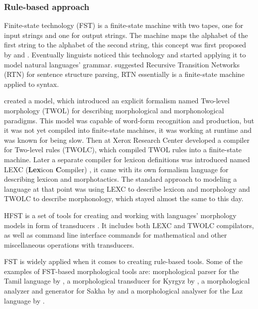 \subsubsection{Rule-based approach}
\par Finite-state technology (FST) is a finite-state machine with two tapes, one for input strings and one for output strings. The machine maps the alphabet of the first string to the alphabet of the second string, this concept was first proposed by \textcite{mealy_method_1955} and \textcite{moore_gedanken_1955}. Eventually linguists noticed this technology and started applying it to model natural languages' grammar. \textcite{woods_trans_1970} suggested Recursive Transition Networks (RTN) for sentence structure parsing, RTN essentially is a finite-state machine applied to syntax. 
\par \textcite{koskenniemi_twol_1983} created a model, which introduced an explicit formalism named Two-level morphology (TWOL) for describing morphological and morphonological paradigms. This model was capable of word-form recognition and production, but it was not yet compiled into finite-state machines, it was working at runtime and was known for being slow. Then \textcite{karttunen_twolc_1987} at Xerox Research Center developed a compiler for Two-level rules (TWOLC), which compiled TWOL rules into a finite-state machine. Later a separate compiler for lexicon definitions was introduced named LEXC (\textbf{Lex}icon \textbf{C}ompiler) \parencite{karttunen_lexc_1993}, it came with its own formalism language for describing lexicon and morphotactics. The standard approach to modeling a language at that point was using LEXC to describe lexicon and morphology and TWOLC to describe morphonology, which stayed almost the same to this day. 
\par {}
\par HFST is a set of tools for creating and working with languages' morphology models in form of transducers \parencite{linden_hfst_2009}. It includes both LEXC and TWOLC compilators, as well as command line interface commands for mathematical and other miscellaneous operations with transducers. 
\par {}
\par FST is widely applied when it comes to creating rule-based tools. Some of the examples of FST-based morphological tools are: morphological parser for the Tamil language by \textcite{sarveswaran_morph_2021}, a morphological transducer for Kyrgyz by \textcite{washington_finite_2012}, a morphological analyzer and generator for Sakha by \textcite{ivanova_free_2022} and a morphological analyser for the Laz language by \textcite{onal_building_2019}.
